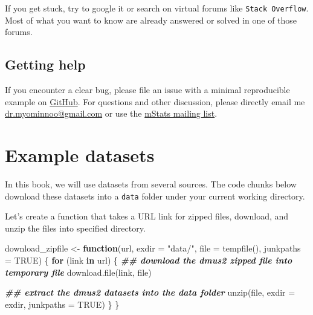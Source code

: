 \documentclass[
]{book}
\newenvironment{Shaded}{\begin{snugshade}}{\end{snugshade}}
\newcommand{\AttributeTok}[1]{\textcolor[rgb]{0.77,0.63,0.00}{#1}}
\newcommand{\ConstantTok}[1]{\textcolor[rgb]{0.00,0.00,0.00}{#1}}
\newcommand{\ControlFlowTok}[1]{\textcolor[rgb]{0.13,0.29,0.53}{\textbf{#1}}}
\newcommand{\DocumentationTok}[1]{\textcolor[rgb]{0.56,0.35,0.01}{\textbf{\textit{#1}}}}
\newcommand{\FunctionTok}[1]{\textcolor[rgb]{0.00,0.00,0.00}{#1}}
\newcommand{\NormalTok}[1]{#1}
\newcommand{\OtherTok}[1]{\textcolor[rgb]{0.56,0.35,0.01}{#1}}
\newcommand{\StringTok}[1]{\textcolor[rgb]{0.31,0.60,0.02}{#1}}
\begin{document}
If you get stuck, try to google it or search on virtual forums like \texttt{Stack\ Overflow}. Most of what you want to know are already answered or solved in one of those forums.

\hypertarget{getting-help}{%
\subsection{Getting help}\label{getting-help}}

If you encounter a clear bug, please file an issue with a minimal
reproducible example on
\href{https://github.com/myominnoo/mStats/issues}{GitHub}. For questions and
other discussion, please directly email me \href{mailto::dr.myominnoo@gmail.com}{dr.myominnoo@gmail.com} or use the \href{https://groups.google.com/g/mstats}{mStats mailing list}.

\hypertarget{exampledata}{%
\section{Example datasets}\label{exampledata}}

In this book, we will use datasets from several sources. The code chunks below download these datasets into a \texttt{data} folder under your current working directory.

Let's create a function that takes a URL link for zipped files, download, and unzip the files into specified directory.

\begin{Shaded}
\begin{Highlighting}[]
\NormalTok{download\_zipfile }\OtherTok{\textless{}{-}} \ControlFlowTok{function}\NormalTok{(url, }\AttributeTok{exdir =} \StringTok{"data/"}\NormalTok{, }\AttributeTok{file =} \FunctionTok{tempfile}\NormalTok{(), }\AttributeTok{junkpaths =} \ConstantTok{TRUE}\NormalTok{) \{}
    \ControlFlowTok{for}\NormalTok{ (link }\ControlFlowTok{in}\NormalTok{ url) \{}
        \DocumentationTok{\#\# download the dmus2 zipped file into temporary file}
        \FunctionTok{download.file}\NormalTok{(link, file)}
        
        \DocumentationTok{\#\# extract the dmus2 datasets into the data folder}
        \FunctionTok{unzip}\NormalTok{(file, }\AttributeTok{exdir =}\NormalTok{ exdir, }\AttributeTok{junkpaths =} \ConstantTok{TRUE}\NormalTok{)}
\NormalTok{    \}}
\NormalTok{\}}
\end{Highlighting}
\end{Shaded}
\end{document}
